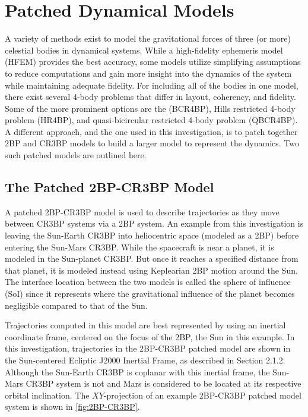 \section{Patched Dynamical Models}
A variety of methods exist to model the gravitational forces of three (or more) celestial bodies in
dynamical systems. While a high-fidelity ephemeris model (HFEM) provides the best accuracy, some
models utilize simplifying assumptions to reduce computations and gain more insight into the
dynamics of the system while maintaining adequate fidelity. For including all of the bodies in one
model, there exist several 4-body problems that differ in layout, coherency, and fidelity. Some of
the more prominent options are the (BCR4BP)\cite{Boudad:2018}, Hills restricted 4-body problem
(HR4BP)\cite{Scheeres:1998}, and quasi-bicircular restricted 4-body problem
(QBCR4BP)\cite{Andreu:2002}. A different approach, and the one used in this investigation, is to
patch together 2BP and CR3BP models to build a larger model to represent the dynamics. Two such
patched models are outlined here.

\subsection{The Patched 2BP-CR3BP Model}
A patched 2BP-CR3BP model is used to describe trajectories as they move between CR3BP systems via a
2BP system. An example from this investigation is leaving the Sun-Earth CR3BP into heliocentric
space (modeled as a 2BP) before entering the Sun-Mars CR3BP. While the spacecraft is near a planet,
it is modeled in the Sun-planet CR3BP. But once it reaches a specified distance from that planet,
it is modeled instead using Keplearian 2BP motion around the Sun\cite{Canales:2021b}. The interface
location between the two models is called the sphere of influence (SoI) since it represents where
the gravitational influence of the planet becomes negligible compared to that of the Sun.

Trajectories computed in this model are best represented by using an inertial coordinate frame,
centered on the focus of the 2BP, the Sun in this example. In this investigation, trajectories in
the 2BP-CR3BP patched model are shown in the Sun-centered Ecliptic J2000 Inertial Frame, as
described in Section 2.1.2. Although the Sun-Earth CR3BP is coplanar with this inertial frame, the
Sun-Mars CR3BP system is not and Mars is considered to be located at its respective orbital
inclination. The $XY$-projection of an example 2BP-CR3BP patched model system is shown in
\cref{fig:2BP-CR3BP}.

